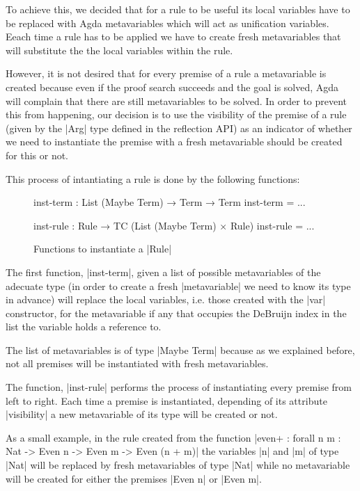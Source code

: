 \documentclass[a4paper]{article}
\begin{document}
To achieve this, we decided that for a rule to be useful its local variables
have to be replaced with Agda metavariables which will act as unification
variables. Eeach time a rule has to be applied we have to create fresh
metavariables that will substitute the the local variables within the rule.

However, it is not desired that for every premise of a rule a metavariable is
created because even if the proof search succeeds and the goal is solved, Agda
will complain that there are still metavariables to be solved. In order to
prevent this from happening, our decision is to use the visibility of the
premise of a rule (given by the |Arg| type defined in the reflection API) as an
indicator of whether we need to instantiate the premise with a fresh
metavariable should be created for this or not.

This process of intantiating a rule is done by the following functions:

\begin{figure}
\small
\begin{code}
  inst-term : List (Maybe Term) → Term → Term
  inst-term = ...

  inst-rule : Rule → TC (List (Maybe Term) × Rule)
  inst-rule = ...
\end{code}
  \label{fig:inst}
  \caption{Functions to instantiate a |Rule|}
\end{figure}

The first function, |inst-term|, given a list of possible metavariables of the
adecuate type (in order to create a fresh |metavariable| we need to know its
type in advance) will replace the local variables, i.e. those created with the
|var| constructor, for the metavariable if any that occupies the DeBruijn index
in the list the variable holds a reference to.

The list of metavariables is of type |Maybe Term| because as we explained
before, not all premises will be instantiated with fresh metavariables.

The function, |inst-rule| performs the process of instantiating every premise
from left to right. Each time a premise is instantiated, depending of its
attribute |visibility| a new metavariable of its type will be created or not.

As a small example, in the rule created from the function |even+ : forall {n m : Nat} -> Even n -> Even m -> Even (n + m)| the variables |n| and |m| of type
|Nat| will be replaced by fresh metavariables of type |Nat| while no
metavariable will be created for either the premises |Even n| or |Even m|.
\end{document}
